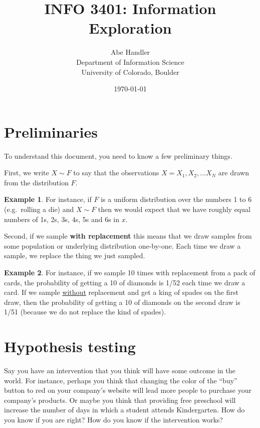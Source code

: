 \documentclass[]{article}
\theoremstyle{definition}
\newtheorem{exmp}{Example}[section]
\begin{document}
\title{INFO 3401: Information Exploration}
\author{Abe Handler \\ Department of Information Science \\ University of Colorado, Boulder}
\date{\today}

\maketitle

\tableofcontents

\section{Preliminaries}

To understand this document, you need to know a few preliminary things.

First, we write $X \sim F$ to say that the observations $X=X_1, X_2, ... X_N$ are drawn from the distribution $F$.

\begin{exmp}
For instance, if $F$ is a uniform distribution over the numbers 1 to 6 (e.g.\ rolling a die) and $X \sim F$ then we would expect that we have roughly equal numbers of 1s, 2s, 3s, 4s, 5s and 6s in $x$.
\end{exmp}

Second, if we sample \textbf{with replacement} this means that we draw samples from some population or underlying distribution one-by-one. Each time we draw a sample, we replace the thing we just sampled. 

\begin{exmp}
For instance, if we sample 10 times with replacement from a pack of cards, the probability of getting a 10 of diamonds is 1/52 each time we draw a card. If we sample \underline{without} replacement and get a king of spades on the first draw, then the probability of getting a 10 of diamonds on the second draw is 1/51 (because we do not replace the kind of spades).
\end{exmp}

\section{Hypothesis testing}

Say you have an intervention that you think will have some outcome in the world. For instance, perhaps you think that changing the color of the ``buy'' button to red on your company's website will lead more people to purchase your company's products. Or maybe you think that providing free preschool will increase the number of days in which a student attends Kindergarten. How do you know if you are right? How do you know if the intervention works?
\end{document}
